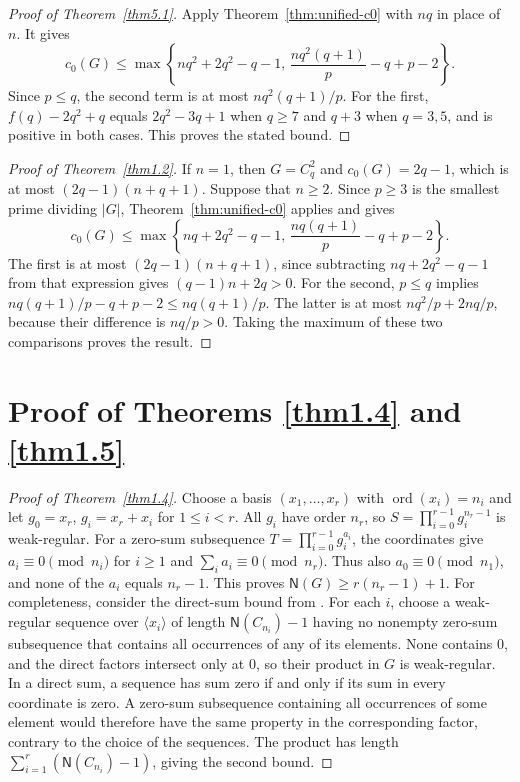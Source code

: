 \documentclass[10pt,a4paper]{amsart}
\theoremstyle{definition}
\theoremstyle{remark}
\numberwithin{equation}{section}
\DeclareMathOperator{\ord}{ord}
\begin{document}
\begin{proof}[Proof of Theorem~\ref{thm5.1}]
Apply Theorem~\ref{thm:unified-c0} with $nq$ in place of $n$. It gives
\[
c_0(G)\le\max\left\{nq^2+2q^2-q-1,\,
\frac{nq^2(q+1)}p-q+p-2\right\}.
\]
Since $p\le q$, the second term is at most $nq^2(q+1)/p$.
For the first, $f(q)-2q^2+q$ equals $2q^2-3q+1$ when $q\ge7$
and $q+3$ when $q=3,5$, and is positive in both cases.
This proves the stated bound.
\end{proof}

\begin{proof}[Proof of Theorem~\ref{thm1.2}]
If $n=1$, then $G=C_q^2$ and $c_0(G)=2q-1$, which is at most
$(2q-1)(n+q+1)$.
Suppose that $n\ge2$. Since $p\ge3$ is the smallest prime dividing
$|G|$, Theorem~\ref{thm:unified-c0} applies and gives
\[
c_0(G)\le\max\left\{nq+2q^2-q-1,\,
\frac{nq(q+1)}p-q+p-2\right\}.
\]
The first is at most $(2q-1)(n+q+1)$, since subtracting
$nq+2q^2-q-1$ from that expression gives $(q-1)n+2q>0$.
For the second, $p\le q$ implies
$nq(q+1)/p-q+p-2\le nq(q+1)/p$.
The latter is at most $nq^2/p+2nq/p$, because their difference is
$nq/p>0$.
Taking the maximum of these two comparisons proves the result.
\end{proof}

\section{Proof of Theorems \ref{thm1.4} and \ref{thm1.5}}


\begin{proof}[Proof of Theorem~\ref{thm1.4}]
Choose a basis $(x_1,\ldots,x_r)$ with $\ord(x_i)=n_i$ and let
$g_0=x_r$, $g_i=x_r+x_i$ for $1\le i<r$.
All $g_i$ have order $n_r$, so $S=\prod_{i=0}^{r-1}g_i^{n_r-1}$ is weak-regular.
For a zero-sum subsequence $T=\prod_{i=0}^{r-1}g_i^{a_i}$, the coordinates give
$a_i\equiv0\pmod{n_i}$ for $i\ge1$ and $\sum_i a_i\equiv0\pmod{n_r}$.
Thus also $a_0\equiv0\pmod{n_1}$, and none of the $a_i$ equals $n_r-1$.
This proves $\mathsf{N}(G)\ge r(n_r-1)+1$.
For completeness, consider the direct-sum bound from
\cite[Theorem~1.1(2)]{[GHHLYZ2022-2]}.
For each $i$, choose a weak-regular sequence over $\langle x_i\rangle$
of length $\mathsf N(C_{n_i})-1$ having no nonempty zero-sum subsequence
that contains all occurrences of any of its elements.
None contains $0$, and the direct factors intersect only at $0$, so their
product in $G$ is weak-regular.
In a direct sum, a sequence has sum zero if and only if its sum in every
coordinate is zero. A zero-sum subsequence containing all occurrences of
some element would therefore have the same property in the corresponding
factor, contrary to the choice of the sequences. The product has length
$\sum_{i=1}^r(\mathsf N(C_{n_i})-1)$, giving the second bound.
\end{proof}
\end{document}
